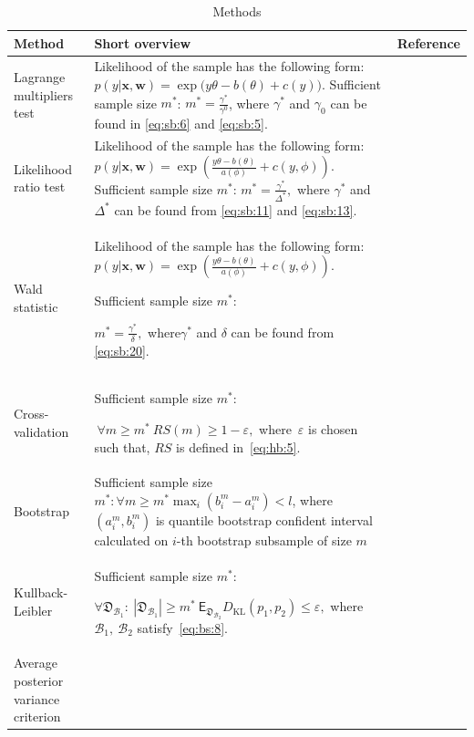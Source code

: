 \documentclass[
11pt,%
tightenlines,%
twoside,%
onecolumn,%
nofloats,%
nobibnotes,%
nofootinbib,%
superscriptaddress,%
noshowpacs,%
centertags]%
{revtex4}
\begin{document}
\begin{table}
\begin{center}
\caption{Methods}
\label{table1}
\begin{tabular}{|p{}|p{}|p{}|}
\hline
	\centering Method &\centering Short overview & Reference\\
\hline
	Lagrange multipliers test &
	Likelihood of the sample has the following form:
   	$p(y|\textbf{x}, \textbf{w}) = \exp\bigl(y\theta- b(\theta) + c\left(y\right)\bigr).$
	Sufficient sample size $m^*$:
	$m^* = \frac{\gamma^*}{\gamma^0}$, where $\gamma^*$ and $\gamma_0$ can be found in \eqref{eq:sb:6} and \eqref{eq:sb:5}.
	&\cite{self1988}\\
\hline
	Likelihood ratio test&
	Likelihood of the sample has the following form:
	$p(y|\textbf{x}, \textbf{w}) = \exp\left(\frac{y\theta- b(\theta)}{a(\phi)} + c\left(y, \phi\right)\right).$
	Sufficient sample size $m^*$: 
	$m^* = \frac{\gamma^*}{\Delta^*},$ where $\gamma^*$ and $\Delta^*$ can be found from \eqref{eq:sb:11} and \eqref{eq:sb:13}.
	&\cite{shieh2000}\\
\hline
	Wald statistic&
	Likelihood of the sample has the following form:
	$p(y|\textbf{x}, \textbf{w}) = \exp\left(\frac{y\theta- b(\theta)}{a(\phi)} + c\left(y, \phi\right)\right).$
	
	Sufficient sample size $m^*$: 
	
	$m^* = \frac{\gamma^*}{\delta},$ where$\gamma^*$ and $\delta$ can be found from \eqref{eq:sb:20}.
	&\cite{shieh2005}\\
\hline
	Cross-validation&
	
	Sufficient sample size $m^*$: 
	
	$~\forall m \geq m^*~RS(m) \geq 1- \varepsilon,$
	where~$\varepsilon$ is chosen such that, $RS$ is defined in~\eqref{eq:hb:5}.
	&\cite{motrenko2014}\\
\hline
	Bootstrap&
	
	Sufficient sample size  $m^*: \forall m\geq m^* \max_i\left(b^m_i - a^m_i\right) < l$, where $(a^m_i,  b^m_i)$ is quantile bootstrap confident interval calculated on $i$-th bootstrap subsample of size $m$

	&\cite{qumsiyeh2013}\\
\hline
	Kullback-Leibler&
	
	Sufficient sample size $m^*$: 
	
	$\forall \mathfrak{D}_{\mathcal{B}_1}:~\left|\mathfrak{D}_{\mathcal{B}_1}\right| \geq m^*  ~ \mathsf{E}_{\mathfrak{D}_{\mathcal{B}_2}}D_\text{KL}\left(p_1, p_2\right) \leq \varepsilon,$
	where $\mathcal{B}_1,~\mathcal{B}_2$ satisfy~\eqref{eq:bs:8}.
	&\cite{motrenko2014}\\
\hline
	Average posterior variance criterion&
	

\end{tabular}
\end{center}
\end{table}
\end{document}
